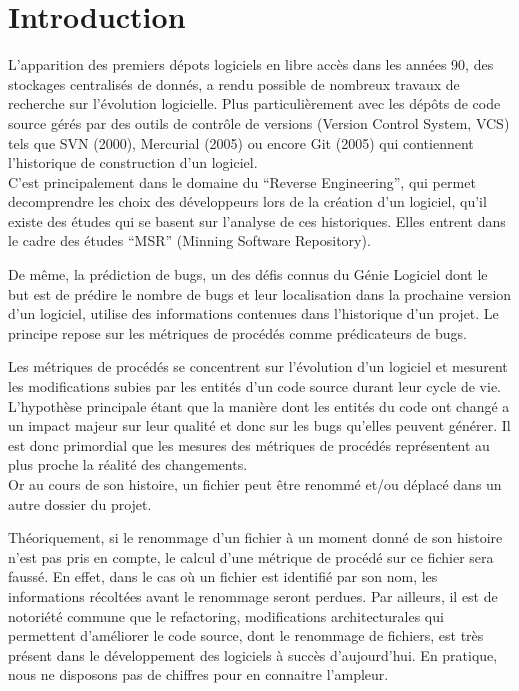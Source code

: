 \section{Introduction}
\label{sec:intro}

L'apparition des premiers dépots logiciels en libre accès dans les années 90, des stockages centralisés de donnés, a rendu possible de nombreux travaux de recherche sur l'évolution logicielle. Plus particulièrement avec les dépôts de code source gérés par des outils de contrôle de versions (Version Control System, VCS) tels que  SVN (2000), Mercurial (2005) ou encore Git (2005) qui contiennent l'historique de construction d'un logiciel.\\  

C'est principalement dans le domaine du ``Reverse Engineering'', qui permet decomprendre les choix des développeurs lors de la création d'un logiciel, qu'il existe des études qui se basent sur l'analyse de ces historiques. Elles entrent dans le cadre des études ``MSR'' (Minning Software Repository).

De même, la prédiction de bugs, un des défis connus du Génie Logiciel dont le but est de prédire le nombre de bugs et leur localisation dans la prochaine version d'un logiciel, utilise des informations contenues dans l'historique d'un projet. Le principe repose sur les métriques de procédés comme prédicateurs de bugs.

Les métriques de procédés se concentrent sur l'évolution d'un logiciel et mesurent les modifications subies par les entités d'un code source durant leur cycle de vie. L'hypothèse principale étant que la manière dont les entités du code ont changé a un impact majeur sur leur qualité et donc sur les bugs qu'elles peuvent générer. Il est donc primordial que les mesures des métriques de procédés représentent au plus proche la réalité des changements.\\

Or au cours de son histoire, un fichier peut être renommé et/ou déplacé dans un autre dossier du projet.

Théoriquement, si le renommage d'un fichier à un moment donné de son histoire n'est pas pris en compte, le calcul d'une métrique de procédé sur ce fichier sera faussé. En effet, dans le cas où un fichier est identifié par son nom, les informations récoltées avant le renommage seront perdues. Par ailleurs, il est de notoriété commune que le refactoring, modifications architecturales qui permettent d'améliorer le code source, dont le renommage de fichiers, est très présent dans le développement des logiciels à succès d'aujourd'hui. En pratique, nous ne disposons pas de chiffres pour en connaitre l'ampleur.\\

